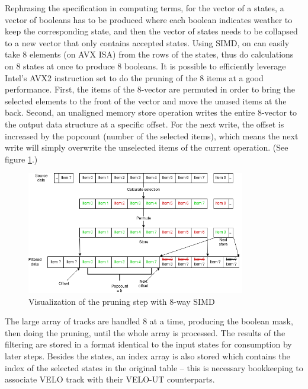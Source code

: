 \documentclass[12pt]{article}
\begin{document}
Rephrasing the specification in computing terms, for the vector of a states, a vector of booleans has to be produced where each boolean indicates weather to keep the corresponding state, and then the vector of states needs to be collapsed to a new vector that only contains accepted states. Using SIMD, on can easily take 8 elements (on AVX ISA) from the rows of the states, thus do calculations on 8 states at once to produce 8 booleans. It is possible to efficiently leverage Intel's AVX2 instruction set to do the pruning of the 8 items at a good performance\cite{lemire_simd_prune}. First, the items of the 8-vector are permuted in order to bring the selected elements to the front of the vector and move the unused items at the back. Second, an unaligned memory store operation writes the entire 8-vector to the output data structure at a specific offset. For the next write, the offset is increased by the popcount (number of the selected items), which means the next write will simply overwrite the unselected items of the current operation. (See figure \ref{fig_velout_opt_simd_filter}.)

\begin{figure}[H]
	\begin{center}
		\includegraphics[width=0.85\textwidth]{velout_opt_simd_filter}
	\end{center}
	\caption{Visualization of the pruning step with 8-way SIMD}
	\label{fig_velout_opt_simd_filter}
\end{figure}

The large array of tracks are handled 8 at a time, producing the boolean mask, then doing the pruning, until the whole array is processed. The results of the filtering are stored in a format identical to the input states for consumption by later steps. Besides the states, an index array is also stored which contains the index of the selected states in the original table -- this is necessary bookkeeping to associate VELO track with their VELO-UT counterparts.
\end{document}
